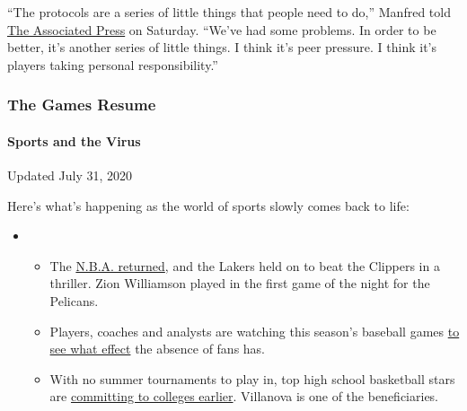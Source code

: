 ``The protocols are a series of little things that people need to do,''
Manfred told
\href{https://apnews.com/eff9d34788720e0b3d6df53c2779fd01}{The
Associated Press} on Saturday. ``We've had some problems. In order to be
better, it's another series of little things. I think it's peer
pressure. I think it's players taking personal responsibility.''

\hypertarget{the-games-resume}{%
\subsubsection{The Games Resume}\label{the-games-resume}}

\hypertarget{sports-and-the-virus}{%
\paragraph{Sports and the Virus}\label{sports-and-the-virus}}

Updated July 31, 2020

Here's what's happening as the world of sports slowly comes back to
life:

\begin{itemize}
\item
  \begin{itemize}
  \tightlist
  \item
    The
    \href{https://www.nytimes3xbfgragh.onion/2020/07/30/sports/basketball/clippers-lakers.html?action=click\&pgtype=Article\&state=default\&region=MAIN_CONTENT_2\&context=storylines_keepup}{N.B.A.
    returned}, and the Lakers held on to beat the Clippers in a
    thriller. Zion Williamson played in the first game of the night for
    the Pelicans.
  \item
    Players, coaches and analysts are watching this season's baseball
    games
    \href{https://www.nytimes3xbfgragh.onion/2020/07/31/sports/baseball/baseball-empty-stadiums-effects.html?action=click\&pgtype=Article\&state=default\&region=MAIN_CONTENT_2\&context=storylines_keepup}{to
    see what effect} the absence of fans has.
  \item
    With no summer tournaments to play in, top high school basketball
    stars are
    \href{https://www.nytimes3xbfgragh.onion/2020/07/30/sports/ncaabasketball/college-basketball-recruiting.html?action=click\&pgtype=Article\&state=default\&region=MAIN_CONTENT_2\&context=storylines_keepup}{committing
    to colleges earlier}. Villanova is one of the beneficiaries.
  \end{itemize}
\end{itemize}

